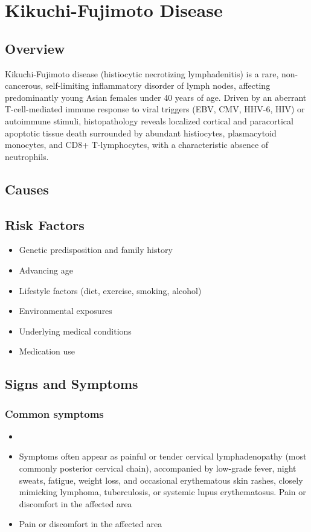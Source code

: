 \chapter{Kikuchi-Fujimoto Disease}
\label{sec:Kikuchi-Fujimoto Disease}

\section{Overview}
Kikuchi-Fujimoto disease (histiocytic necrotizing lymphadenitis) is a rare, non-cancerous, self-limiting inflammatory disorder of lymph nodes, affecting predominantly young Asian females under 40 years of age. Driven by an aberrant T-cell-mediated immune response to viral triggers (EBV, CMV, HHV-6, HIV) or autoimmune stimuli, histopathology reveals localized cortical and paracortical apoptotic tissue death surrounded by abundant histiocytes, plasmacytoid monocytes, and CD8+ T-lymphocytes, with a characteristic absence of neutrophils.
\section{Causes}
\section{Risk Factors}

\begin{itemize}[noitemsep]
  \item Genetic predisposition and family history
  \item Advancing age
  \item Lifestyle factors (diet, exercise, smoking, alcohol)
  \item Environmental exposures
  \item Underlying medical conditions
  \item Medication use
\end{itemize}
\section{Signs and Symptoms}

\subsection{Common symptoms}
\begin{itemize}[noitemsep]
  \item \item Symptoms often appear as painful or tender cervical lymphadenopathy (most commonly posterior cervical chain), accompanied by low-grade fever, night sweats, fatigue, weight loss, and occasional erythematous skin rashes, closely mimicking lymphoma, tuberculosis, or systemic lupus erythematosus. Pain or discomfort in the affected area    \item Pain or discomfort in the affected area
  \end{itemize}

